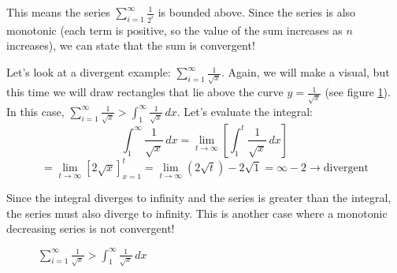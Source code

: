 This means the series $\sum_{i = 1}^\infty \frac{1}{2^i}$ is bounded above. 
Since the series is also monotonic (each term is positive, so the value of the 
sum increases as $n$ increases), we can state that the sum is convergent! 

Let's look at a divergent example: $\sum_{i = 1}^\infty \frac{1}{\sqrt{x}}$. 
Again, we will make a visual, but this time we will draw rectangles that lie 
above the curve $y = \frac{1}{\sqrt{x}}$ (see figure \ref{fig:invroot}). In 
this case, $\sum_{i = 1}^\infty \frac{1}{\sqrt{x}}> \int_1^\infty 
\frac{1}{\sqrt{x}}\,dx$. Let's evaluate the integral:
$$\int_1^\infty \frac{1}{\sqrt{x}}\,dx = \lim_{t \to \infty} \left[ \int_1^t 
\frac{1}{\sqrt{x}}\,dx \right] $$
$$= \lim_{t \to \infty} \left[ 2 \sqrt{x} \right]_{x=1}^t= \lim_{t \to \infty} 
\left( 2\sqrt{t} \right) - 2\sqrt{1} = \infty - 2 \rightarrow \text{divergent}$$

Since the integral diverges to infinity and the series is greater than the 
integral, the series must also diverge to infinity. This is another case where 
a monotonic decreasing series is not convergent!

\begin{figure}[htbp]
    \centering
    \caption{$\sum_{i = 1}^\infty \frac{1}{\sqrt{x}}> \int_1^\infty 
    \frac{1}{\sqrt{x}}\,dx$}
    \label{fig:invroot}
\end{figure}

